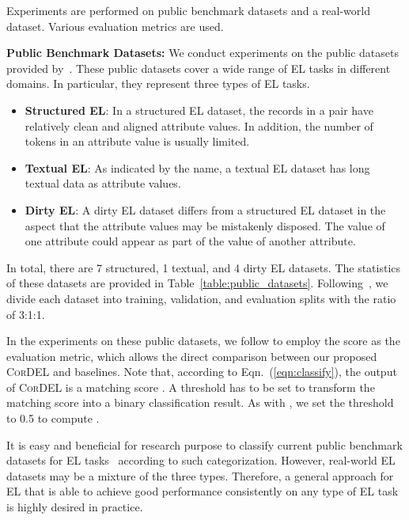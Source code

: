 \documentclass[conference]{IEEEtran}
\begin{document}
Experiments are performed on public benchmark datasets and a real-world dataset. Various evaluation metrics are used.

\textbf{Public Benchmark Datasets:} We conduct experiments on the public datasets provided by~\cite{mudgal2018deep}. These public datasets cover a wide range of EL tasks in different domains. In particular, they represent three types of EL tasks.
\begin{itemize}
    \item \textbf{Structured EL}: In a structured EL dataset, the records in a pair have relatively clean and aligned attribute values. In addition, the number of tokens in an attribute value is usually limited.
    
    \item \textbf{Textual EL}: As indicated by the name, a textual EL dataset has long textual data as attribute values.
    
    \item \textbf{Dirty EL}: A dirty EL dataset differs from a structured EL dataset in the aspect that the attribute values may be mistakenly disposed. The value of one attribute could appear as part of the value of another attribute.
\end{itemize}

In total, there are 7 structured, 1 textual, and 4 dirty EL datasets. The statistics of these datasets are provided in Table~\ref{table:public_datasets}. Following~\cite{mudgal2018deep}, we divide each dataset into training, validation, and evaluation splits with the ratio of 3:1:1.

In the experiments on these public datasets, we follow \cite{mudgal2018deep} to employ the  score as the evaluation metric, which allows the direct comparison between our proposed \textsc{CorDEL} and baselines. Note that, according to Eqn.~(\ref{eqn:classify}), the output of \textsc{CorDEL} is a matching score . A threshold has to be set to transform the matching score into a binary classification result. As with \cite{mudgal2018deep}, we set the threshold to 0.5 to compute .

It is easy and beneficial for research purpose to classify current public benchmark datasets for EL tasks~\cite{mudgal2018deep} according to such categorization. However, real-world EL datasets may be a mixture of the three types. Therefore, a general approach for EL that is able to achieve good performance consistently on any type of EL task is highly desired in practice.
\end{document}
